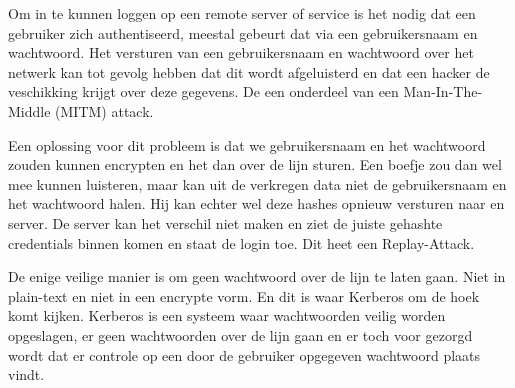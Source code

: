 Om in te kunnen loggen op een remote server of service is het nodig dat een gebruiker zich authentiseerd, meestal gebeurt dat via een gebruikersnaam en wachtwoord. Het versturen van een gebruikersnaam en wachtwoord over het netwerk kan tot gevolg hebben dat dit wordt afgeluisterd en dat een hacker de veschikking krijgt over deze gegevens. De een onderdeel van een Man-In-The-Middle (MITM) attack.

Een oplossing voor dit probleem is dat we gebruikersnaam en het wachtwoord zouden kunnen encrypten en het dan over de lijn sturen. Een boefje zou dan wel mee kunnen luisteren, maar kan uit de verkregen data niet de gebruikersnaam en het wachtwoord halen. Hij kan echter wel deze hashes opnieuw versturen naar en server. De server kan het verschil niet maken en ziet de juiste gehashte credentials binnen komen en staat de login toe. Dit heet een Replay-Attack.

De enige veilige manier is om geen wachtwoord over de lijn te laten gaan. Niet in plain-text en niet in een encrypte vorm. En dit is waar Kerberos om de hoek komt kijken. Kerberos is een systeem waar wachtwoorden veilig worden opgeslagen, er geen wachtwoorden over de lijn gaan en er toch voor gezorgd wordt dat er controle op een door de gebruiker opgegeven wachtwoord plaats vindt.

